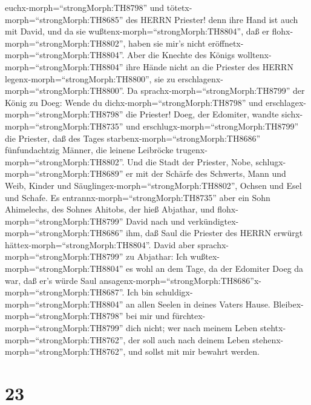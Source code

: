 euchx-morph=``strongMorph:TH8798'' und
tötetx-morph=``strongMorph:TH8685'' des HERRN Priester! denn ihre Hand
ist auch mit David, und da sie wußtenx-morph=``strongMorph:TH8804'', daß
er flohx-morph=``strongMorph:TH8802'', haben sie mir's nicht
eröffnetx-morph=``strongMorph:TH8804''. Aber die Knechte des Königs
wolltenx-morph=``strongMorph:TH8804'' ihre Hände nicht an die Priester
des HERRN legenx-morph=``strongMorph:TH8800'', sie zu
erschlagenx-morph=``strongMorph:TH8800''.  Da
sprachx-morph=``strongMorph:TH8799'' der König zu Doeg: Wende du
dichx-morph=``strongMorph:TH8798'' und
erschlagex-morph=``strongMorph:TH8798'' die Priester! Doeg, der
Edomiter, wandte sichx-morph=``strongMorph:TH8735'' und
erschlugx-morph=``strongMorph:TH8799'' die Priester, daß des Tages
starbenx-morph=``strongMorph:TH8686'' fünfundachtzig Männer, die leinene
Leibröcke trugenx-morph=``strongMorph:TH8802''.  Und die
Stadt der Priester, Nobe, schlugx-morph=``strongMorph:TH8689'' er mit
der Schärfe des Schwerts, Mann und Weib, Kinder und
Säuglingex-morph=``strongMorph:TH8802'', Ochsen und Esel und Schafe.
 Es entrannx-morph=``strongMorph:TH8735'' aber ein Sohn
Ahimelechs, des Sohnes Ahitobs, der hieß Abjathar, und
flohx-morph=``strongMorph:TH8799'' David nach  und
verkündigtex-morph=``strongMorph:TH8686'' ihm, daß Saul die Priester des
HERRN erwürgt hättex-morph=``strongMorph:TH8804''.  David
aber sprachx-morph=``strongMorph:TH8799'' zu Abjathar: Ich
wußtex-morph=``strongMorph:TH8804'' es wohl an dem Tage, da der Edomiter
Doeg da war, daß er's würde Saul
ansagenx-morph=``strongMorph:TH8686''x-morph=``strongMorph:TH8687''. Ich
bin schuldigx-morph=``strongMorph:TH8804'' an allen Seelen in deines
Vaters Hause.  Bleibex-morph=``strongMorph:TH8798'' bei mir
und fürchtex-morph=``strongMorph:TH8799'' dich nicht; wer nach meinem
Leben stehtx-morph=``strongMorph:TH8762'', der soll auch nach deinem
Leben stehenx-morph=``strongMorph:TH8762'', und sollst mit mir bewahrt
werden.

\hypertarget{section-22}{%
\section{23}\label{section-22}}

